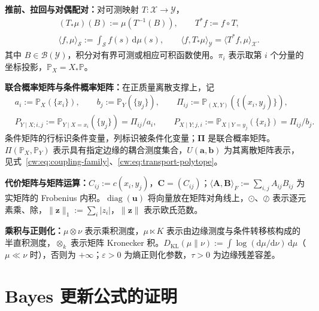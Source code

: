 \textbf{推前、拉回与对偶配对：}对可测映射 $T:\mathcal X\to\mathcal Y$，
\begin{equation*}
\begin{aligned}
&(T_*\mu)(B):=\mu(T^{-1}(B)),\qquad T^*f:=f\circ T,\\
&\langle f,\mu\rangle_{\mathcal S}:=\int_{\mathcal S}f(s)\,\mathrm d\mu(s),\qquad
\langle f,T_*\mu\rangle_{\mathcal Y}=\langle T^*f,\mu\rangle_{\mathcal X}.
\end{aligned}
\end{equation*}
其中 $B\in\mathcal B(\mathcal Y)$，积分对有界可测或相应可积函数使用。$\pi_i$ 表示取第 $i$ 个分量的坐标投影，$\mathbb P_X=X_*\mathbb P$。

\textbf{联合概率矩阵与条件概率矩阵：}在正质量离散支撑上，记
\begin{equation*}
\begin{aligned}
&a_i:=\mathbb P_X(\{x_i\}),\qquad b_j:=\mathbb P_Y(\{y_j\}),\qquad
\Pi_{ij}:=\mathbb P_{(X,Y)}(\{(x_i,y_j)\}),\\
&P_{Y\mid X;i,j}:=\mathbb P_{Y\mid X=x_i}(\{y_j\})=\Pi_{ij}/a_i,\qquad
P_{X\mid Y;j,i}:=\mathbb P_{X\mid Y=y_j}(\{x_i\})=\Pi_{ij}/b_j.
\end{aligned}
\end{equation*}
条件矩阵的行标识条件变量，列标识被条件化变量；$\bm\Pi$ 是联合概率矩阵。$\Pi(\mathbb P_X,\mathbb P_Y)$ 表示具有指定边缘的耦合测度集合，$U(\bm a,\bm b)$ 为其离散矩阵表示，见式~\eqref{cw:eq:coupling-family}、\eqref{cw:eq:transport-polytope}。

\textbf{代价矩阵与矩阵运算：}$C_{ij}:=c(x_i,y_j)$，$\bm C=(C_{ij})$；$\langle\bm A,\bm B\rangle_F:=\sum_{i,j}A_{ij}B_{ij}$ 为实矩阵的 Frobenius 内积。$\operatorname{diag}(\bm u)$ 将向量放在矩阵对角线上，$\odot$、$\oslash$ 表示逐元素乘、除，$\|\bm z\|_1:=\sum_i|z_i|$，$\|\bm z\|$ 表示欧氏范数。

\textbf{乘积与正则化：}$\mu\otimes\nu$ 表示乘积测度，$\mu\ltimes K$ 表示由边缘测度与条件转移核构成的半直积测度，$\otimes_k$ 表示矩阵 Kronecker 积。$D_{\mathrm{KL}}(\mu\|\nu):=\int\log(\mathrm d\mu/\mathrm d\nu)\,\mathrm d\mu$（$\mu\ll\nu$ 时），否则为 $+\infty$；$\varepsilon>0$ 为熵正则化参数，$\tau>0$ 为边缘残差容差。





\section{Bayes 更新公式的证明}\label{cw:app:proofs}

